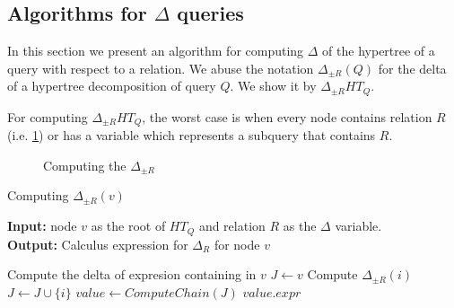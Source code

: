 \documentclass[12pt]{article}
\begin{document}
\subsection{Algorithms for $\Delta$ queries}
\label{sec:algorithmdelta}
In this section we present an algorithm for computing  $\Delta$ of the hypertree of a query with respect to a relation. We abuse the notation $\Delta_{\pm R}(Q)$ for the delta of a hypertree decomposition of query $Q$. We show it by $\Delta_{\pm R}{HT_{Q}}$.\par 
For computing $\Delta_{\pm R}{HT_{Q}}$, the worst case is when every node contains relation $R$ (i.e. \ref{fig3}) or has a variable which represents a subquery that contains $R$.
\begin{figure}[htbp]
\begin{center}
\usetikzlibrary{fit}
\end{center}
\caption{Computing the $\Delta_{\pm R}$}
\label{fig3}
\end{figure}

\begin{algorithm}[H]
\caption{Computing $\Delta_{\pm R}(v)$} 
\label{alg1}
\textbf{Input:} node $v$ as the root of $HT_{Q}$ and relation $R$ as the $\Delta$ variable.\\
\textbf{Output:} Calculus expression for $\Delta_{R}$ for node $v$
\begin{algorithmic}[1]
\STATE Compute the delta of expresion containing in $v$
\STATE $J\gets v$ 
\STATE Compute $\Delta_{\pm R}(i)$%
\STATE $J\gets J\cup\{i\}$%
\ENDIF
\ENDFOR
\STATE $value\gets ComputeChain(J)$
\RETURN $value.expr$
\end{algorithmic}
\end{algorithm}
\end{document}
